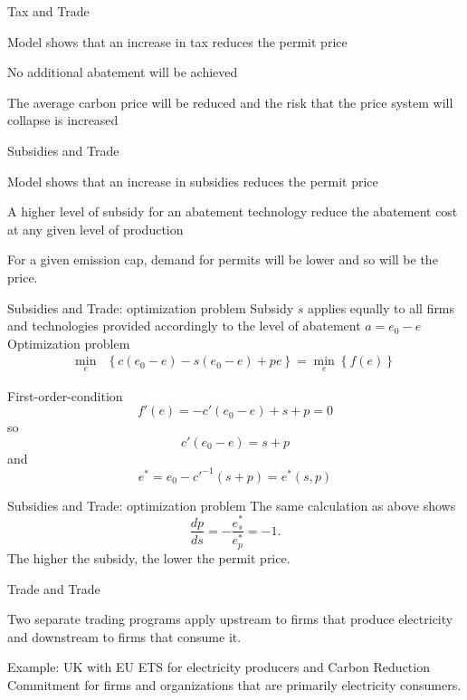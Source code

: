 
{Tax and Trade}


	Model shows that an increase in tax reduces the permit price

	No additional abatement will be achieved

	The average carbon price will be reduced and the risk that the price system will collapse is increased


{Subsidies and Trade}


	Model shows that an increase in subsidies reduces the permit price

	A higher level of subsidy for an abatement technology reduce the abatement cost at any given level of production

	For a given emission cap, demand for permits will be lower and so will be the price.


{Subsidies and Trade: optimization problem}
Subsidy $s$ applies equally to all firms and technologies provided accordingly to the level of abatement $a = e_0 - e$ \\


	 Optimization problem
\begin{align}
\min_{e} & \left\{c(e_0-e)-s(e_0-e)+pe\right\} = \min_{e}\left\{f(e)\right\}
\end{align}

	 First-order-condition
\[
f'(e)=-c'(e_0-e)+ s+p = 0
\]
so
\[
c'(e_0-e)=s+p
\]
and
\[
e^*=e_0-c'^{-1}(s+p)=e^*(s,p)
\]



{Subsidies and Trade: optimization problem}
The same calculation as above shows
\[
\frac{dp}{ds} = -\frac{e^*_s}{e^*_p}=-1.
\]
The higher the subsidy, the lower the permit price.

{Trade and Trade}


	Two separate trading programs apply upstream to firms that produce electricity and downstream to firms that consume it.

	Example: UK with EU ETS for electricity producers and Carbon Reduction Commitment for firms and organizations that are primarily electricity consumers.

